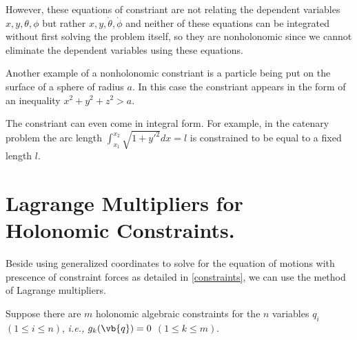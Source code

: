 \documentclass[a4paper,12pt]{report}
\begin{document}
However, these equations of constriant are not relating the dependent variables \(x,y,\theta ,\phi \) but rather \(x,y,\dot{\theta },\dot{\phi }  \) and neither of these equations can be integrated without first solving the problem itself, so they are nonholonomic since we cannot eliminate the dependent variables using these equations.

Another example of a nonholonomic constriant is a particle being put on the surface of a sphere of radius \(a\). In this case the constriant appears in the form of an inequality \(x^2+y^2+z^2  > a\). 

The constriant can even come in integral form. For example, in the catenary problem the arc length \(\int_{x_1 }^{x_2 } \sqrt{1+y'^2}dx = l  \) is constrained to be equal to a fixed length \(l\). 


\section{Lagrange Multipliers for Holonomic Constraints.}

Beside using generalized coordinates to solve for the equation of motions with prescence of constraint forces as detailed in \cref{constraints}, we can use the method of Lagrange multipliers.

Suppose there are \(m\) holonomic algebraic constraints for the \(n\) variables \(q_{i} \) \((1 \le i \le n)\), \textit{i.e.,} \(g_{k}(\vb{q} ) = 0 \) \((1 \le k \le m)\).
\end{document}
